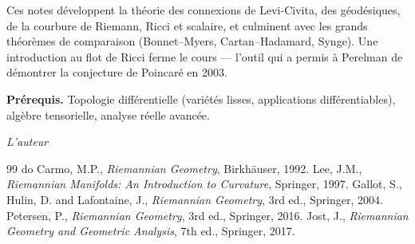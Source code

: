 \documentclass[12pt,a4paper,twoside]{book}
\theoremstyle{definition}
\theoremstyle{plain}
\theoremstyle{remark}
\begin{document}
\medskip

Ces notes d\'eveloppent la th\'eorie des connexions de Levi-Civita, des g\'eod\'esiques, de la courbure de Riemann, Ricci et scalaire, et culminent avec les grands th\'eor\`emes de comparaison (Bonnet--Myers, Cartan--Hadamard, Synge). Une introduction au flot de Ricci ferme le cours --- l'outil qui a permis \`a Perelman de d\'emontrer la conjecture de Poincar\'e en 2003.

\medskip

\noindent\textbf{Pr\'erequis.} Topologie diff\'erentielle (vari\'et\'es lisses, applications diff\'erentiables), alg\`ebre tensorielle, analyse r\'eelle avanc\'ee.

\vfill
\hfill\textit{L'auteur}


\mainmatter














\backmatter
\begin{thebibliography}{99}
 do Carmo, M.P., \emph{Riemannian Geometry}, Birkh\"auser, 1992.
 Lee, J.M., \emph{Riemannian Manifolds: An Introduction to Curvature}, Springer, 1997.
 Gallot, S., Hulin, D. and Lafontaine, J., \emph{Riemannian Geometry}, 3rd ed., Springer, 2004.
 Petersen, P., \emph{Riemannian Geometry}, 3rd ed., Springer, 2016.
 Jost, J., \emph{Riemannian Geometry and Geometric Analysis}, 7th ed., Springer, 2017.
\end{thebibliography}
\printindex
\end{document}

